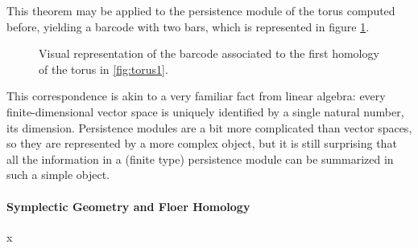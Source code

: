 This theorem may be applied to the persistence module of the torus computed before, yielding a barcode with two bars, which is represented in figure \ref{fig:bctorus}.

\begin{figure}
\centering
{}
\caption{Visual representation of the barcode associated to the first homology of the torus in \ref{fig:torus1}.}\label{fig:bctorus}
\end{figure}

This correspondence is akin to a very familiar fact from linear algebra: every finite-dimensional vector space is uniquely identified by a single natural number, its dimension. Persistence modules are a bit more complicated than vector spaces, so they are represented by a more complex object, but it is still surprising that all the information in a (finite type) persistence module can be summarized in such a simple object.



\paragraph{Symplectic Geometry and Floer Homology}

x